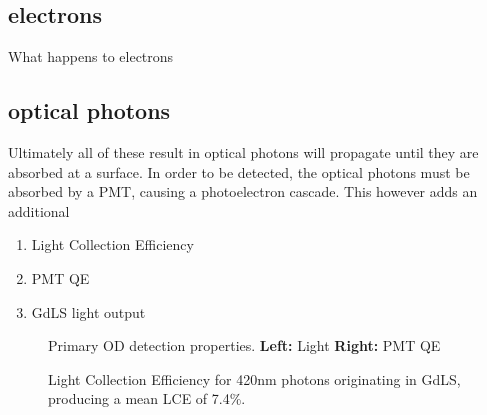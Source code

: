 \subsection{electrons}
\par
What happens to electrons


\subsection{optical photons}
\par
Ultimately all of these result in optical photons will propagate until they are absorbed at a surface.
In order to be detected, the optical photons must be absorbed by a PMT, causing a photoelectron cascade.
This however adds an additional 

\begin{tcolorbox}[colback=red!5!white, colframe=red!50!black, title=Key Plots]
\begin{enumerate}
    \item Light Collection Efficiency
    \item PMT QE
    \item GdLS light output
\end{enumerate}
\end{tcolorbox}


\begin{figure}[!htbp]%
\centering
{}
\caption{Primary OD detection properties. 
\textbf{Left:} Light 
\textbf{Right:} PMT QE
}
\label{fig:od_detection_properties}
\end{figure}


\begin{figure}[!htbp]
\centering
\resizebox{\textwidth}{!}{

}
\caption{Light Collection Efficiency for 420nm photons originating in GdLS, producing a mean LCE of 7.4\%.}
\label{fig:od_lce}
\end{figure}

